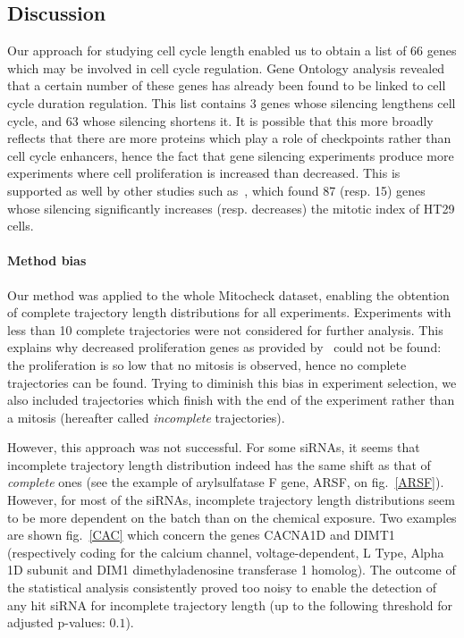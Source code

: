 \subsection{Discussion}
Our approach for studying cell cycle length enabled us to obtain a list of 66 genes which may be involved in cell cycle regulation. Gene Ontology analysis revealed that a certain number of these genes has already been found to be linked to cell cycle duration regulation. This list contains 3 genes whose silencing lengthens cell cycle, and 63 whose silencing shortens it. It is possible that this more broadly reflects that there are more proteins which play a role of checkpoints rather than cell cycle enhancers, hence the fact that gene silencing experiments produce more experiments where cell proliferation is increased than decreased. This is supported as well by other studies such as~\cite{pmid16564017}, which found 87 (resp. 15) genes whose silencing significantly increases (resp. decreases) the mitotic index of HT29 cells.

\paragraph{Method bias}
Our method was applied to the whole Mitocheck dataset, enabling the obtention of complete trajectory length distributions for all experiments. Experiments with less than 10 complete trajectories were not considered for further analysis. This explains why decreased proliferation genes as provided by~\cite{pmid20360735} could not be found: the proliferation is so low that no mitosis is observed, hence no complete trajectories can be found. Trying to diminish this bias in experiment selection, we also included trajectories which finish with the end of the experiment rather than a mitosis (hereafter called \textit{incomplete} trajectories). 

However, this approach was not successful. For some siRNAs, it seems that incomplete trajectory length distribution indeed has the same shift as that of \textit{complete} ones (see the example of arylsulfatase F gene, ARSF, on fig.~\ref{ARSF}). However, for most of the siRNAs, incomplete trajectory length distributions seem to be more dependent on the batch than on the chemical exposure. Two examples are shown fig.~\ref{CAC} which concern the genes CACNA1D and DIMT1 (respectively coding for the calcium channel, voltage-dependent, L Type, Alpha 1D subunit and DIM1 dimethyladenosine transferase 1 homolog). The outcome of the statistical analysis consistently proved too noisy to enable the detection of any hit siRNA for incomplete trajectory length (up to the following threshold for adjusted p-values: $0.1$).

